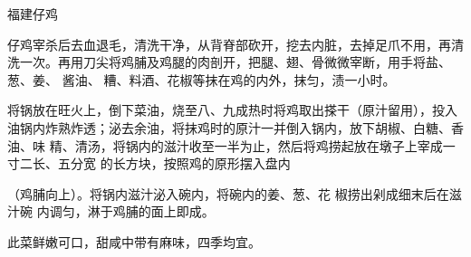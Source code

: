 \begin{recipe}{福建仔鸡}

\ingredients


\preparation

\step 仔鸡宰杀后去血退毛，清洗干净，从背脊部砍开，挖去内脏，去掉足爪不用，再清
洗一次。再用刀尖将鸡脯及鸡腿的肉剖开，把腿、翅、骨微微宰断，用手将盐、葱、姜、
酱油、𫃑糟、料酒、花椒等抹在鸡的内外，抹匀，渍一小时。

\step 将锅放在旺火上，倒下菜油，烧至八、九成热时将鸡取出搽干（原汁留用），投入
油锅内炸熟炸透；泌去余油，将抹鸡时的原汁一并倒入锅内，放下胡椒、白糖、香油、味
精、清汤，将锅内的滋汁收至一半为止，然后将鸡捞起放在墩子上宰成一寸二长、五分宽
的长方块，按照鸡的原形摆入盘内

（鸡脯向上）。将锅内滋汁泌入碗内，将碗内的姜、葱、花 椒捞出剁成细末后在滋汁碗
内调匀，淋于鸡脯的面上即成。

\features

此菜鲜嫩可口，甜咸中带有麻味，四季均宜。

\end{recipe}

